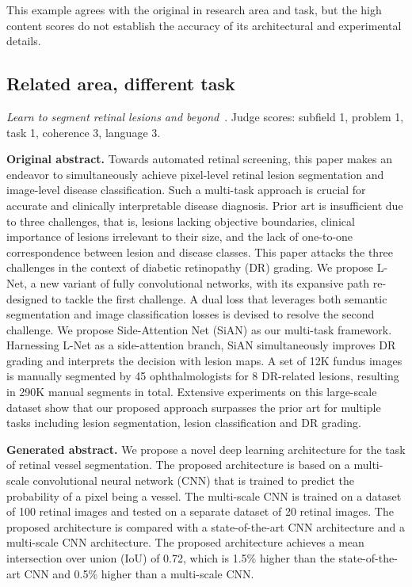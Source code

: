 This example agrees with the original in research area and task, but the high content scores do not establish the accuracy of its architectural and experimental details.

\subsection{Related area, different task}
\textit{Learn to segment retinal lesions and beyond}~\cite{wei2021retinal}. Judge scores: subfield 1, problem 1, task 1, coherence 3, language 3.\nopagebreak[4]

\textbf{Original abstract.} Towards automated retinal screening, this paper makes an endeavor to simultaneously achieve pixel-level retinal lesion segmentation and image-level disease classification. Such a multi-task approach is crucial for accurate and clinically interpretable disease diagnosis. Prior art is insufficient due to three challenges, that is, lesions lacking objective boundaries, clinical importance of lesions irrelevant to their size, and the lack of one-to-one correspondence between lesion and disease classes. This paper attacks the three challenges in the context of diabetic retinopathy (DR) grading. We propose L-Net, a new variant of fully convolutional networks, with its expansive path re-designed to tackle the first challenge. A dual loss that leverages both semantic segmentation and image classification losses is devised to resolve the second challenge. We propose Side-Attention Net (SiAN) as our multi-task framework. Harnessing L-Net as a side-attention branch, SiAN simultaneously improves DR grading and interprets the decision with lesion maps. A set of 12K fundus images is manually segmented by 45 ophthalmologists for 8 DR-related lesions, resulting in 290K manual segments in total. Extensive experiments on this large-scale dataset show that our proposed approach surpasses the prior art for multiple tasks including lesion segmentation, lesion classification and DR grading.

\textbf{Generated abstract.} We propose a novel deep learning architecture for the task of retinal vessel segmentation. The proposed architecture is based on a multi-scale convolutional neural network (CNN) that is trained to predict the probability of a pixel being a vessel. The multi-scale CNN is trained on a dataset of 100 retinal images and tested on a separate dataset of 20 retinal images. The proposed architecture is compared with a state-of-the-art CNN architecture and a multi-scale CNN architecture. The proposed architecture achieves a mean intersection over union (IoU) of 0.72, which is 1.5\% higher than the state-of-the-art CNN and 0.5\% higher than a multi-scale CNN.

